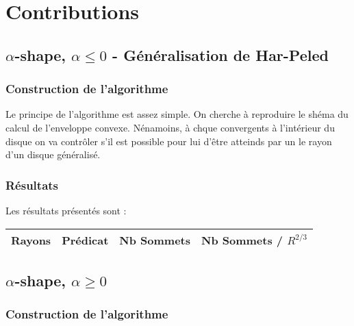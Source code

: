 \section{Contributions}

\subsection{$\alpha$-shape, $\alpha \leq 0$ - Généralisation de Har-Peled}

\subsubsection{Construction de l'algorithme}

Le principe de l’algorithme est assez simple. On cherche à reproduire le shéma du calcul de l’enveloppe convexe. Nénamoins, à chque convergents à l'intérieur du disque on va contrôler s'il est possible pour lui d'être atteinds par un le rayon d'un disque généralisé.

\subsubsection{Résultats}

Les résultats présentés sont : 

\begin{tabular}{|l|c||c|c|}
\hline
Rayons & Prédicat & Nb Sommets & Nb Sommets / $R^{2/3}$\\
\hline

\hline
\end{tabular} 



\subsection{$\alpha$-shape, $\alpha \geq 0$}

\subsubsection{Construction de l'algorithme}


